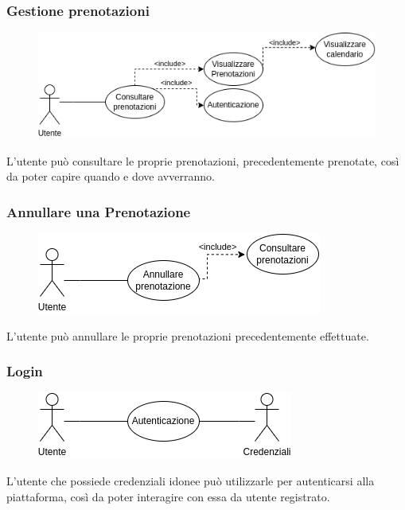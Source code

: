 \documentclass{article}
\begin{document}
\subsubsection{Gestione prenotazioni}\label{rf_3}
\begin{description}

	\begin{figure}[htp]
	\centering
	\includegraphics[width=\textwidth]{rf3.png}
	\end{figure}

    \item L'utente può consultare le proprie prenotazioni, precedentemente prenotate, così da poter capire quando e dove avverranno.
\end{description}

\subsubsection{Annullare una Prenotazione}\label{rf_4}
\begin{description}

	\begin{figure}[htp]
	\centering
	\includegraphics[]{rf4.png}
	\end{figure}

    \item L'utente può annullare le proprie prenotazioni precedentemente effettuate.
\end{description}


\subsubsection{Login}\label{rf_5}
\begin{description}

	\begin{figure}[htp]
	\centering
	\includegraphics[]{rf5.png}
	\end{figure}

    \item L'utente che possiede credenziali idonee può utilizzarle per autenticarsi alla piattaforma, così da poter interagire con essa da utente registrato.
\end{description}
\end{document}
